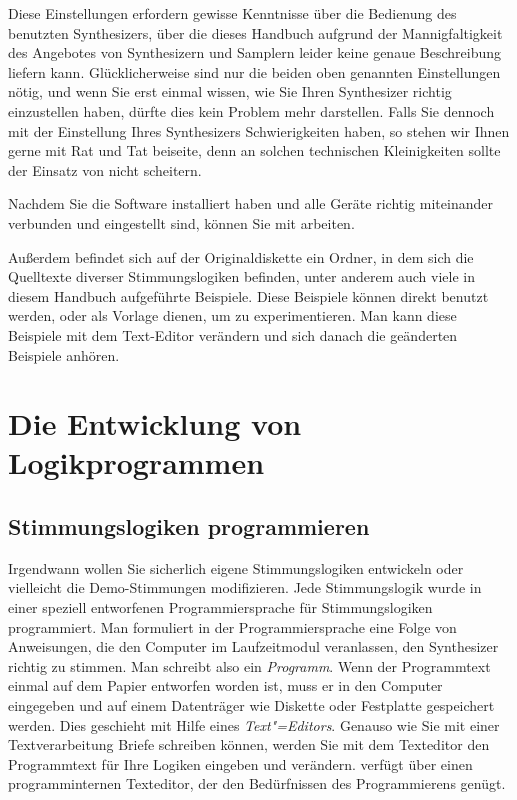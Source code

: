 Diese Einstellungen erfordern gewisse Kenntnisse über die Bedienung
des benutzten Synthesizers, über die dieses Handbuch aufgrund der
Mannigfaltigkeit des Angebotes von Synthesizern und Samplern leider
keine genaue Beschreibung liefern kann. Glücklicherweise sind nur die
beiden oben genannten Einstellungen nötig, und wenn Sie erst einmal
wissen, wie Sie Ihren Synthesizer richtig einzustellen haben, dürfte
dies kein Problem mehr darstellen. Falls Sie dennoch mit der
Einstellung Ihres Synthesizers Schwierigkeiten haben, so stehen wir
Ihnen gerne mit Rat und Tat beiseite, denn an solchen technischen
Kleinigkeiten sollte der Einsatz von \mutabor{} nicht scheitern.


Nachdem Sie die Software installiert haben und alle Geräte richtig
miteinander verbunden und eingestellt sind, 
können Sie mit \mutabor{}
arbeiten. 

Außerdem befindet sich auf der Originaldiskette ein Ordner,
in dem sich die Quelltexte diverser
Stimmungslogiken befinden, unter anderem auch viele in diesem Handbuch
aufgeführte Beispiele.
Diese Beispiele können direkt benutzt werden, oder als Vorlage
dienen, um zu experimentieren. Man kann diese Beispiele mit dem
Text-Editor verändern und sich danach die geänderten Beispiele
anhören.

\chapter{Die Entwicklung von Logikprogrammen}\label{cha:die-entwicklung-von}

\section{Stimmungslogiken programmieren}\label{sec:stimm-progr}

Irgendwann wollen Sie sicherlich eigene Stimmungslogiken entwickeln
oder vielleicht die Demo-Stimmungen modifizieren. Jede Stimmungslogik
wurde in einer speziell entworfenen Programmiersprache für
Stimmungslogiken programmiert. Man formuliert in
der Programmiersprache eine Folge von
Anweisungen, die den Computer im Laufzeitmodul veranlassen, den
Synthesizer richtig zu stimmen. Man schreibt also ein \emph{Programm}.
Wenn der Programmtext einmal auf dem Papier entworfen worden ist, muss
er in den Computer eingegeben und auf einem Datenträger wie Diskette
oder Festplatte gespeichert werden. Dies geschieht mit Hilfe eines
\emph{Text"=Editors}. Genauso wie Sie mit einer Textverarbeitung Briefe
schreiben können, werden Sie mit dem Texteditor den Programmtext für
Ihre Logiken eingeben und verändern. \mutabor{} verfügt über einen
programminternen Texteditor, der den Bedürfnissen des Programmierens
genügt.

